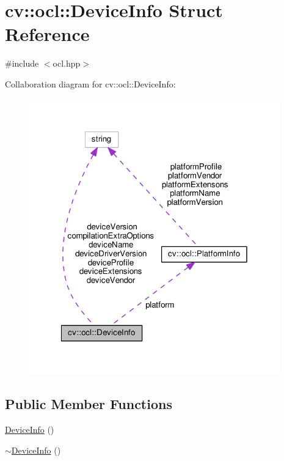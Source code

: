 \hypertarget{structcv_1_1ocl_1_1DeviceInfo}{\section{cv\-:\-:ocl\-:\-:Device\-Info Struct Reference}
\label{structcv_1_1ocl_1_1DeviceInfo}
}


{\ttfamily \#include $<$ocl.\-hpp$>$}



Collaboration diagram for cv\-:\-:ocl\-:\-:Device\-Info\-:\nopagebreak
\begin{figure}[H]
\begin{center}
\leavevmode
\includegraphics[width=307pt]{structcv_1_1ocl_1_1DeviceInfo__coll__graph}
\end{center}
\end{figure}
\subsection*{Public Member Functions}
\begin{DoxyCompactItemize}
\item 
\hyperlink{structcv_1_1ocl_1_1DeviceInfo_a92539ba70d4a66c8cd87ef2b6e132ff1}{Device\-Info} ()
\item 
\hyperlink{structcv_1_1ocl_1_1DeviceInfo_a5a580af20efde257dccddd89f8e97651}{$\sim$\-Device\-Info} ()
\end{DoxyCompactItemize}
